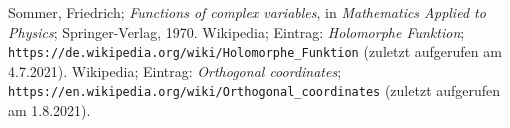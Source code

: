 %


\begin{thebibliography}{99}
 Sommer, Friedrich; \textit{Functions of complex variables}, in \textit{Mathematics
          Applied to Physics}; Springer-Verlag, 1970.
 Wikipedia; Eintrag: \textit{Holomorphe Funktion};       
                 {\small \verb+https://de.wikipedia.org/wiki/Holomorphe_Funktion+} (zuletzt aufgerufen
                 am 4.7.2021).    
 Wikipedia; Eintrag: \textit{Orthogonal coordinates};                 
                 {\small \verb+https://en.wikipedia.org/wiki/Orthogonal_coordinates+} (zuletzt aufgerufen
                 am 1.8.2021).    
\end{thebibliography}


%